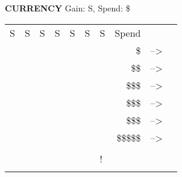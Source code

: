 \begin{flushleft}
  \textbf{CURRENCY} \textcolor{supplemental}{Gain: S, Spend: \$}
\end{flushleft}
\label{currency}
\begin{tabular}{|
>{\columncolor{currency}}l |
>{\columncolor{currency}}l |
>{\columncolor{currency}}l |
>{\columncolor{currency}}l |
>{\columncolor{currency}}l |
>{\columncolor{currency}}l |
>{\columncolor{currency}}l |
r c l} \hhline{-------}
{S} &
  {S} &
  {S} &
  {\color{currency} S} &
  {\color{currency} S} &
  {\color{currency} S} &
  {\color{currency} S} &
  Spend & & \color{supplemental}{Gain} \\ \hhline{-------}
{\color{supplemental}} &
  {\color{supplemental}} &
  {\color{supplemental}} &
  {\color{supplemental}} &
  {\color{supplemental}} &
  {\color{supplemental}} &
  {\color{supplemental}} &
  \$ & --\textgreater{} & \color{supplemental}{die +-1} \\ \hhline{-------}
{\color{supplemental}} &
  {\color{supplemental}} &
  {\color{supplemental}} &
  {\color{supplemental}} &
  {\color{supplemental}} &
  {\color{supplemental}} &
  {\color{supplemental}} &
  \$\$ & --\textgreater{} & \color{supplemental}{/} \\ \hhline{-------}
{\color{supplemental}} &
  {\color{supplemental}} &
  {\color{supplemental}} &
  {\color{supplemental}} &
  {\color{supplemental}} &
  {\color{supplemental}} &
  {\color{supplemental}} &
  \$\$\$ & --\textgreater{} & \color{supplemental}{T} \\ \hhline{-------}
{\color{supplemental}} &
  {\color{supplemental}} &
  {\color{supplemental}} &
  {\color{supplemental}} &
  {\color{supplemental}} &
  {\color{supplemental}} &
  {\color{supplemental}} &
  \$\$\$ & --\textgreater{} & \color{supplemental}{C} \\ \hhline{-------}
{\color{supplemental}} &
  {\color{supplemental}} &
  {\color{supplemental}} &
  {\color{supplemental}} &
  {\color{supplemental}} &
  {\color{supplemental}} &
  {\color{supplemental}} &
  \$\$\$ & --\textgreater{} & \color{supplemental}{M} \\ \hhline{-------}
{\color{supplemental}} &
  {\color{supplemental}} &
  {\color{supplemental}} &
  {\color{supplemental}} &
  {\color{supplemental}} &
  {\color{supplemental}} &
  {\color{supplemental}} &
  \$\$\$\$\$ & --\textgreater{} & \color{supplemental}{:)} \\ \hhline{-------}
{\color{supplemental}} &
  {\color{supplemental}} &
  {\color{supplemental}} &
  {\color{supplemental}} &
  {\color{supplemental}} &
  {\color{supplemental}} &
  {\color{supplemental}} & & & \\ \hhline{-------}
{\color{supplemental}} &
  {\color{supplemental}} &
  {\color{supplemental}} &
  {\color{supplemental}} &
  {\color{supplemental}} &
  {\color{supplemental}} &
  {!} & & & \\ \hhline{-------}
\end{tabular}
